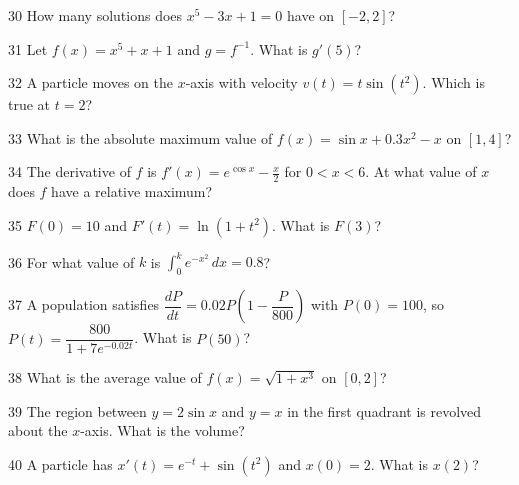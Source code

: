 \documentclass{apcalc}
\begin{document}
\begin{q}{30}
How many solutions does $x^5-3x+1=0$ have on $[-2,2]$?
\end{q}
\begin{q}{31}
Let $f(x)=x^5+x+1$ and $g=f^{-1}$. What is $g'(5)$?
\end{q}
\begin{q}{32}
A particle moves on the $x$-axis with velocity $v(t)=t\sin(t^2)$. Which is true at $t=2$?
\end{q}
\begin{q}{33}
What is the absolute maximum value of $f(x)=\sin x+0.3x^2-x$ on $[1,4]$?
\end{q}
\begin{q}{34}
The derivative of $f$ is $f'(x)=e^{\cos x}-\frac x2$ for $0<x<6$. At what value of $x$ does $f$ have a relative maximum?
\end{q}
\begin{q}{35}
$F(0)=10$ and $F'(t)=\ln(1+t^2)$. What is $F(3)$?
\end{q}
\begin{q}{36}
For what value of $k$ is $\displaystyle\int_0^ke^{-x^2}\,dx=0.8$?
\end{q}
\begin{q}{37}
A population satisfies $\dfrac{dP}{dt}=0.02P\left(1-\dfrac{P}{800}\right)$ with $P(0)=100$, so $P(t)=\dfrac{800}{1+7e^{-0.02t}}$. What is $P(50)$?
\end{q}
\begin{q}{38}
What is the average value of $f(x)=\sqrt{1+x^3}$ on $[0,2]$?
\end{q}
\begin{q}{39}
The region between $y=2\sin x$ and $y=x$ in the first quadrant is revolved about the $x$-axis. What is the volume?
\end{q}
\begin{q}{40}
A particle has $x'(t)=e^{-t}+\sin(t^2)$ and $x(0)=2$. What is $x(2)$?
\end{q}
\end{document}
